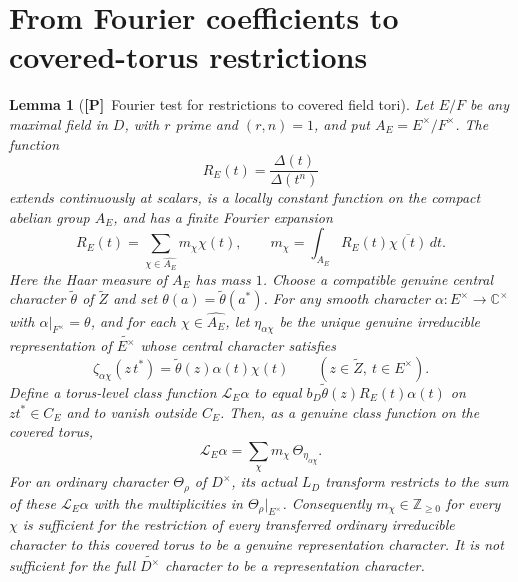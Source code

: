 \documentclass[11pt]{article}
\newcommand{\Ptag}{\textnormal{\textbf{[P]}}}
\theoremstyle{plain}
\newtheorem{lemma}[theorem]{Lemma}
\theoremstyle{definition}
\begin{document}
\section{From Fourier coefficients to covered-torus restrictions}
\begin{lemma}[\Ptag\ Fourier test for restrictions to covered field tori]\label{lem:toral-Fourier}
Let $E/F$ be any maximal field in $D$, with $r$ prime and
$(r,n)=1$, and put $A_E=E^\times/F^\times$.  The function
\[
 R_E(t)=\frac{\Delta(t)}{\Delta(t^n)}
\]
extends continuously at scalars, is a locally constant function
on the compact abelian group $A_E$, and has a finite Fourier expansion
\begin{equation}\label{eq:R-Fourier}
 R_E(t)=\sum_{\chi\in\widehat{A_E}}m_\chi\chi(t),
 \qquad
 m_\chi=\int_{A_E}R_E(t)\overline{\chi(t)}\,dt.
\end{equation}
Here the Haar measure of $A_E$ has mass $1$.
Choose a compatible genuine central character
$\widetilde\theta$ of $\widetilde Z$ and set
$\theta(a)=\widetilde\theta(a^*)$.  For any smooth character
$\alpha:E^\times\to\mathbb C^\times$ with
$\alpha|_{F^\times}=\theta$, and for each $\chi\in\widehat{A_E}$,
let $\eta_{\alpha\chi}$ be the unique genuine irreducible
representation of $\widetilde{E^\times}$ whose central character
satisfies
\[
 \zeta_{\alpha\chi}(z\,t^*)=
 \widetilde\theta(z)\alpha(t)\chi(t)
 \qquad(z\in\widetilde Z,\ t\in E^\times).
\]
Define a torus-level class function $\mathcal L_E\alpha$ to equal
$b_D\widetilde\theta(z)R_E(t)\alpha(t)$ on $z t^*\in C_E$
and to vanish outside $C_E$.  Then, as a genuine class function
on the \emph{covered torus},
\begin{equation}\label{eq:toral-branch}
 \mathcal L_E\alpha
 =\sum_\chi m_\chi\,\Theta_{\eta_{\alpha\chi}}.
\end{equation}
For an ordinary character $\Theta_\rho$ of $D^\times$,
its actual $L_D$ transform restricts to the sum of these
$\mathcal L_E\alpha$ with the multiplicities in
$\Theta_\rho|_{E^\times}$.
Consequently $m_\chi\in\mathbb Z_{\geq0}$ for every $\chi$
is sufficient for the restriction of every transferred ordinary
irreducible character to this covered torus to be a genuine
representation character.  It is not sufficient for the full
$\widetilde{D^\times}$ character to be a representation character.
\end{lemma}
\end{document}
